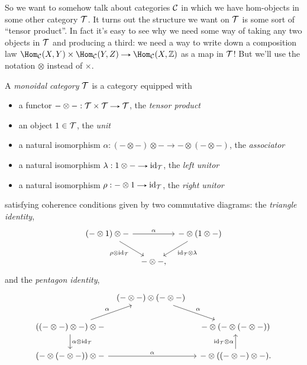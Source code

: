 So we want to somehow talk about categories $\mathcal{C}$ in which we have
hom-objects in some other category $\mathcal{T}$. It turns out the structure we
want on $\mathcal{T}$ is some sort of ``tensor product''. In fact it's easy to
see why we need some way of taking any two objects in $\mathcal{T}$ and
producing a third: we need a way to write down a composition law
$\Hom_\C(X,Y) \times \Hom_\C(Y,Z) \to \Hom_\C(X,\Z)$ as a map in $\mathcal{T}$!
But we'll use the notation $\otimes$ instead of $\times$.

\begin{definition}
  A \textit{monoidal category} $\mathcal{T}$ is a category equipped with
  \begin{itemize}
  \item a functor $- \otimes - : \T \times \T \to \T$, the
    \textit{tensor product}
  \item an object $1 \in \mathcal{T}$, the \textit{unit}
  \item a natural isomorphism $\alpha : (- \otimes -) \otimes - \to -
    \otimes (- \otimes -)$, the \textit{associator}
  \item a natural isomorphism $\lambda : 1 \otimes - \to \id_\T$, the
    \textit{left unitor}
  \item a natural isomorphism $\rho : - \otimes 1 \to \id_\T$, the
    \textit{right unitor}
  \end{itemize}
  satisfying coherence conditions given by two commutative diagrams:
  the \textit{triangle identity},
    \[
    \begin{tikzcd}[column sep = tiny]
      (- \otimes 1) \otimes - \ar{rr}{\alpha} \ar{dr}[below]{\rho
        \otimes \id_\T\hspace{30pt}} & \ & - \otimes (1 \otimes -)
      \ar{dl}{\id_\T \otimes \lambda} \\ \ & - \otimes -, & \
    \end{tikzcd}
    \]
    and the \textit{pentagon identity},
    \[
    \begin{tikzcd}[column sep = tiny]
      \ & (- \otimes -) \otimes (- \otimes -) \ar{dr}{\alpha} \ \\ ((-
      \otimes -) \otimes -) \otimes - \ar{ur}{\alpha} \ar{d}{\alpha
        \otimes \id_\T} & \ & - \otimes (- \otimes (- \otimes -))
      \\ (- \otimes (- \otimes -)) \otimes - \ar{rr}{\alpha} & \ & -
      \otimes ((- \otimes -) \otimes -) \ar{u}{\id_\T \otimes \alpha}.
    \end{tikzcd}
    \]
\end{definition}

